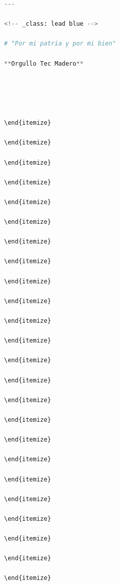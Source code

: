 \begin{itemize}
\begin{itemize}
\begin{itemize}
\begin{itemize}
\begin{itemize}
\begin{itemize}
\begin{enumerate}
\begin{enumerate}
\begin{enumerate}
\begin{enumerate}
\begin{lstlisting}[language=Python]
---

<!-- _class: lead blue -->

# "Por mi patria y por mi bien"

**Orgullo Tec Madero**





\end{itemize}

\end{itemize}

\end{itemize}

\end{itemize}

\end{itemize}

\end{itemize}

\end{itemize}

\end{itemize}

\end{itemize}

\end{itemize}

\end{itemize}

\end{itemize}

\end{itemize}

\end{itemize}

\end{itemize}

\end{itemize}

\end{itemize}

\end{itemize}

\end{itemize}

\end{itemize}

\end{itemize}

\end{itemize}

\end{itemize}

\end{itemize}


\end{lstlisting}
\end{enumerate}
\end{enumerate}
\end{enumerate}
\end{enumerate}
\end{itemize}
\end{itemize}
\end{itemize}
\end{itemize}
\end{itemize}
\end{itemize}
